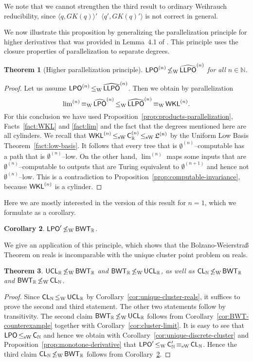 \documentclass[a4paper]{amsart}
\def\IN{{\mathbb{N}}}
\def\IR{{\mathbb{R}}}
\def\Low{\mathfrak{L}}
\def\LPO{\text{\rm\sffamily LPO}}
\def\LLPO{\text{\rm\sffamily LLPO}}
\def\WKL{\text{\rm\sffamily WKL}}
\def\BWT{\text{\rm\sffamily BWT}}
\def\C{\mbox{\rm\sffamily C}}
\def\LPO{\mbox{\rm\sffamily LPO}}
\def\LLPO{\mbox{\rm\sffamily LLPO}}
\def\CL{\text{\rm\sffamily CL}}
\def\UCL{\text{\rm\sffamily UCL}}
\def\leqT{\mathop{\leq_{\mathrm{T}}}}
\def\leqW{\mathop{\leq_{\mathrm{W}}}}
\def\equivW{\mathop{\equiv_{\mathrm{W}}}}
\def\leqSW{\mathop{\leq_{\mathrm{sW}}}}
\def\equivSW{\mathop{\equiv_{\mathrm{sW}}}}
\def\nleqW{\mathop{\not\leq_{\mathrm{W}}}}
\newtheorem{theorem}{Theorem}[section]
\newtheorem{corollary}[theorem]{Corollary}
\theoremstyle{definition}
\begin{document}
We note that we cannot strengthen the third result to ordinary Weihrauch reducibility, 
since $\langle q,GK(q)\rangle'\leqT\langle q',GK(q)'\rangle$ is not correct in general.

We now illustrate this proposition by generalizing the parallelization principle for higher derivatives that 
was provided in Lemma~4.1 of \cite{BG11a}. This principle uses the 
closure properties of parallelization to separate degrees. 

\begin{theorem}[Higher parallelization principle]
\label{thm:parallelization-principle}
$\LPO^{(n)}\nleqW\widehat{\LLPO}^{(n)}$ for all $n\in\IN$.
\end{theorem}
\begin{proof}
Let us assume $\LPO^{(n)}\leqW\widehat{\LLPO}^{(n)}$.
Then we obtain by parallelization
\[\lim\nolimits^{(n)}\equivW\widehat{\LPO}^{(n)}\leqW\widehat{\LLPO}^{(n)}\equivW\WKL^{(n)}.\]
For this conclusion we have used Proposition~\ref{prop:products-parallelization}, Facts~\ref{fact:WKL} and \ref{fact:lim} and the fact
that the degrees mentioned here are all cylinders.
We recall that $\WKL^{(n)}\leqSW\C_\IR^{(n)}\leqSW\Low^{(n)}$ by the Uniform Low Basis Theorem~\ref{fact:low-basis}.
It follows that every tree that is $\emptyset^{(n)}$--computable has a path
that is $\emptyset^{(n)}$--low. On the other hand, $\lim^{(n)}$ maps some
inputs that are $\emptyset^{(n)}$--computable to outputs that
are Turing equivalent to $\emptyset^{(n+1)}$ and hence not $\emptyset^{(n)}$--low.
This is a contradiction to Proposition~\ref{prop:computable-invariance},
because $\WKL^{(n)}$ is a cylinder.
\end{proof}

Here we are mostly interested in the version of this result for $n=1$, which we formulate as
a corollary.

\begin{corollary}
\label{cor:parallelization-principle-BWT}
$\LPO'\nleqW\BWT_\IR$.
\end{corollary}

We give an application of this principle, which shows that the Bolzano-Weierstra\ss{}
Theorem on reals is incomparable with the unique cluster point problem on reals.

\begin{theorem}
\label{thm:UCL-BWT}
$\UCL_\IR\nleqW\BWT_\IR$ and $\BWT_\IR\nleqW\UCL_\IR$, as well as $\CL_\IN\nleqW\BWT_\IR$ and $\BWT_\IR\nleqW\CL_\IN$.
\end{theorem}
\begin{proof}
Since $\CL_\IN\leqW\UCL_\IR$ by Corollary~\ref{cor:unique-cluster-reals}, it suffices to prove the second
and third statement. The other two statements follow by transitivity.
The second claim $\BWT_\IR\nleqW\UCL_\IR$ follows from Corollary~\ref{cor:BWT-counterexample}
together with Corollary~\ref{cor:cluster-limit}.
It is easy to see that $\LPO\leqSW\C_\IN$ and hence we obtain with Corollary~\ref{cor:unique-discrete-cluster}
and Proposition~\ref{prop:monotone-derivative}
that $\LPO'\leqW\C_\IN'\equivSW\CL_\IN$. Hence the third claim $\CL_\IN\nleqW\BWT_\IR$ follows from 
Corollary~\ref{cor:parallelization-principle-BWT}.
\end{proof}
\end{document}
